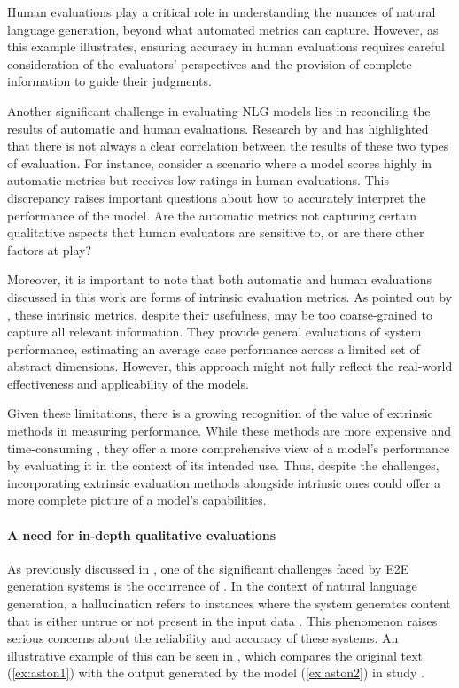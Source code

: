 Human evaluations play a critical role in understanding the nuances of natural language generation, beyond what automated metrics can capture. However, as this example illustrates, ensuring accuracy in human evaluations requires careful consideration of the evaluators' perspectives and the provision of complete information to guide their judgments.

Another significant challenge in evaluating NLG models lies in reconciling the results of automatic and human evaluations. Research by \citet{novikova-etal-2017-need} and \citet{ferreira2018advances} has highlighted that there is not always a clear correlation between the results of these two types of evaluation. For instance, consider a scenario where a model scores highly in automatic metrics but receives low ratings in human evaluations. This discrepancy raises important questions about how to accurately interpret the performance of the model. Are the automatic metrics not capturing certain qualitative aspects that human evaluators are sensitive to, or are there other factors at play?
 
Moreover, it is important to note that both automatic and human evaluations discussed in this work are forms of intrinsic evaluation metrics. As pointed out by \citet{van-miltenburg-etal-2021-underreporting}, these intrinsic metrics, despite their usefulness, may be too coarse-grained to capture all relevant information. They provide general evaluations of system performance, estimating an average case performance across a limited set of abstract dimensions. However, this approach might not fully reflect the real-world effectiveness and applicability of the models. 

Given these limitations, there is a growing recognition of the value of extrinsic methods in measuring performance. While these methods are more expensive and time-consuming \citep{gkatzia-mahamood-2015-snapshot}, they offer a more comprehensive view of a model's performance by evaluating it in the context of its intended use. Thus, despite the challenges, incorporating extrinsic evaluation methods alongside intrinsic ones could offer a more complete picture of a \context model's capabilities. 

\paragraph*{A need for in-depth qualitative evaluations}

As previously discussed in , one of the significant challenges faced by E2E generation systems is the occurrence of . In the context of natural language generation, a hallucination refers to instances where the system generates content that is either untrue or not present in the input data \citep{rohrbach-etal-2018-object,hallucination2018,nie-etal-2019-simple}. This phenomenon raises serious concerns about the reliability and accuracy of these systems. An illustrative example of this can be seen in , which compares the original text (\ref{ex:aston1}) with the output generated by the model  (\ref{ex:aston2}) in study \studF.


